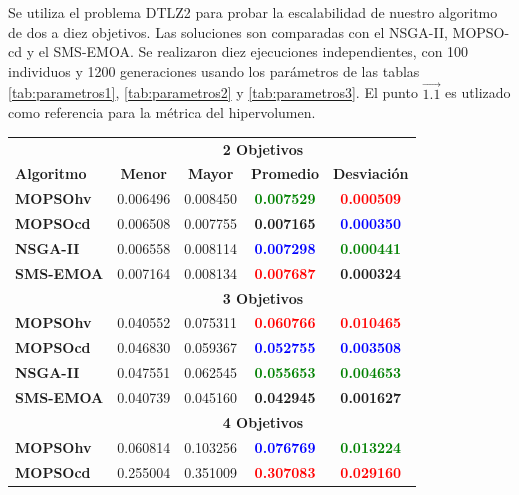  Se utiliza el problema DTLZ2 para probar la escalabilidad de nuestro algoritmo de dos a diez objetivos. Las soluciones son comparadas con 
 el NSGA-II, MOPSO-cd y el SMS-EMOA. Se realizaron diez ejecuciones independientes, con 100 individuos y 1200 generaciones usando los 
 par\'ametros de las tablas \ref{tab:parametros1}, \ref{tab:parametros2} y \ref{tab:parametros3}. El punto $\vec{1.1}$ es utlizado como 
 referencia para la m\'etrica del hipervolumen.
 
\begin{longtable}{|l|cc|cc|} 
\hline
    & \multicolumn{4}{|c|}{\textbf{2 Objetivos}} \\ 
	\textbf{Algoritmo} & \textbf{Menor} & \textbf{Mayor} & \textbf{Promedio} & \textbf{Desviaci\'on} \\  \hline \hline
	\textbf{MOPSOhv} & 0.006496 & 0.008450 & \textbf{\textcolor{green}{0.007529}} & \textbf{\textcolor{red}{0.000509}} \\ 
	\textbf{MOPSOcd} & 0.006508 & 0.007755 & \textbf{0.007165} & \textbf{\textcolor{blue}{0.000350}} \\ 
	\textbf{NSGA-II} & 0.006558 & 0.008114 & \textbf{\textcolor{blue}{0.007298}} & \textbf{\textcolor{green}{0.000441}} \\  
	\textbf{SMS-EMOA}& 0.007164 & 0.008134 & \textbf{\textcolor{red}{0.007687}} & \textbf{0.000324}  \\  
	\hline\hline
    & \multicolumn{4}{|c|}{\textbf{3  Objetivos}} \\ 
	\hline\hline
	\textbf{MOPSOhv} & 0.040552 & 0.075311 & \textbf{\textcolor{red}{0.060766}} & \textbf{\textcolor{red}{0.010465}} \\ 
	\textbf{MOPSOcd} & 0.046830 & 0.059367 & \textbf{\textcolor{blue}{0.052755}} & \textbf{\textcolor{blue}{0.003508}} \\ 
	\textbf{NSGA-II} & 0.047551 & 0.062545 & \textbf{\textcolor{green}{0.055653}} & \textbf{\textcolor{green}{0.004653}} \\  
	\textbf{SMS-EMOA}& 0.040739 & 0.045160 & \textbf{0.042945} &\textbf{0.001627} \\
	\hline\hline
    & \multicolumn{4}{|c|}{\textbf{4 Objetivos}} \\ 
	\hline\hline
	\textbf{MOPSOhv} & 0.060814 & 0.103256 & \textbf{\textcolor{blue}{0.076769}} & \textbf{\textcolor{green}{0.013224}} \\ 
	\textbf{MOPSOcd} & 0.255004 & 0.351009 & \textbf{\textcolor{red}{0.307083}} & \textbf{\textcolor{red}{0.029160}} \\ 

\end{longtable}
